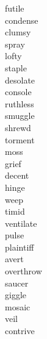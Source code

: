 \documentclass[a4paper, 11pt]{ctexart}
\begin{document}
\begin{multicols*}{3}
\begin{description}
\item[futile]

\item[condense]

\item[clumsy]

\item[spray]

\item[lofty]

\item[staple]

\item[desolate]

\item[console]

\item[ruthless]

\item[smuggle]

\item[shrewd]

\item[torment]

\item[moss]

\item[grief]

\item[decent]

\item[hinge]

\item[weep]

\item[timid]

\item[ventilate]

\item[pulse]

\item[plaintiff]

\item[avert]

\item[overthrow]

\item[saucer]

\item[giggle]

\item[mosaic]

\item[veil]

\item[contrive]


\end{description}
\end{multicols*}
\end{document}
